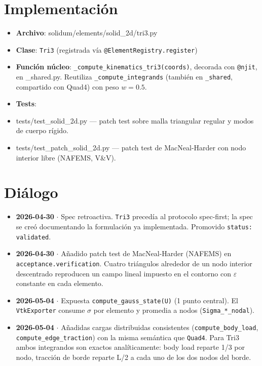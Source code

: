 \documentclass[11pt,letterpaper,oneside]{report}
\begin{document}
\section{Implementación}

\begin{itemize}
  \item \textbf{Archivo}: solidum/elements/solid\_2d/tri3.py
  \item \textbf{Clase}: \texttt{Tri3} (registrada vía \texttt{@ElementRegistry.register})
  \item \textbf{Función núcleo}: \texttt{\_compute\_kinematics\_tri3(coords)}, decorada con \texttt{@njit}, en \_shared.py. Reutiliza \texttt{\_compute\_integrands} (también en \texttt{\_shared}, compartido con Quad4) con peso $w = 0{.}5$.
  \item \textbf{Tests}:
  \item tests/test\_solid\_2d.py --- patch test sobre malla triangular regular y modos de cuerpo rígido.
  \item tests/test\_patch\_solid\_2d.py --- patch test de MacNeal-Harder con nodo interior libre (NAFEMS, V\&V).
\end{itemize}


\section{Diálogo}

\begin{itemize}
  \item \textbf{2026-04-30} \ensuremath{\cdot} Spec retroactiva. \texttt{Tri3} precedía al protocolo spec-first; la spec se creó documentando la formulación ya implementada. Promovido \texttt{status: validated}.
  \item \textbf{2026-04-30} \ensuremath{\cdot} Añadido patch test de MacNeal-Harder (NAFEMS) en \texttt{acceptance.verification}. Cuatro triángulos alrededor de un nodo interior descentrado reproducen un campo lineal impuesto en el contorno con \ensuremath{\varepsilon} constante en cada elemento.
  \item \textbf{2026-05-04} \ensuremath{\cdot} Expuesta \texttt{compute\_gauss\_state(U)} (1 punto central). El \texttt{VtkExporter} consume \ensuremath{\sigma} por elemento y promedia a nodos (\texttt{Sigma\_*\_nodal}).
  \item \textbf{2026-05-04} \ensuremath{\cdot} Añadidas cargas distribuidas consistentes (\texttt{compute\_body\_load}, \texttt{compute\_edge\_traction}) con la misma semántica que \texttt{Quad4}. Para Tri3 ambos integrandos son exactos analíticamente: body load reparte 1/3 por nodo, tracción de borde reparte L/2 a cada uno de los dos nodos del borde.
\end{itemize}
\end{document}
